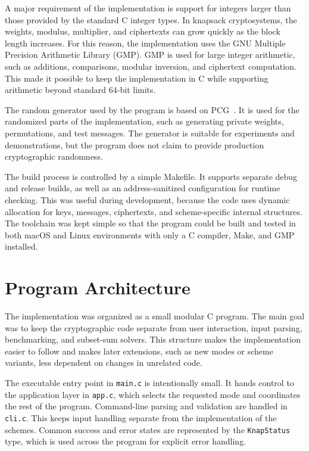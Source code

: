 A major requirement of the implementation is support for integers larger than
those provided by the standard C integer types. In knapsack cryptosystems, the
weights, modulus, multiplier, and ciphertexts can grow quickly as the block
length increases. For this reason, the implementation uses the GNU Multiple
Precision Arithmetic Library (GMP). GMP is used for large integer arithmetic,
such as additions, comparisons, modular inversion, and ciphertext computation.
This made it possible to keep the implementation in C while supporting
arithmetic beyond standard 64-bit limits.

The random generator used by the program is based on PCG~\cite{ONeill2014PCG}.
It is used for the randomized parts of the implementation, such as generating
private weights, permutations, and test messages. The generator is suitable for
experiments and demonstrations, but the program does not claim to provide
production cryptographic randomness.

The build process is controlled by a simple Makefile. It supports separate
debug and release builds, as well as an address-sanitized configuration for
runtime checking. This was useful during development, because the code uses
dynamic allocation for keys, messages, ciphertexts, and scheme-specific
internal structures. The toolchain was kept simple so that the program could be
built and tested in both macOS and Linux environments with only a C compiler,
Make, and GMP installed.

\section{Program Architecture}

The implementation was organized as a small modular C program. The main goal
was to keep the cryptographic code separate from user interaction, input
parsing, benchmarking, and subset-sum solvers. This structure makes the
implementation easier to follow and makes later extensions, such as new modes or
scheme variants, less dependent on changes in unrelated code.

The executable entry point in \texttt{main.c} is intentionally small. It
hands control to the application layer in \texttt{app.c}, which selects the
requested mode and coordinates the rest of the program. Command-line parsing
and validation are handled in \texttt{cli.c}. This keeps input handling
separate from the implementation of the schemes. Common success and error
states are represented by the \texttt{KnapStatus} type, which is used across
the program for explicit error handling.

